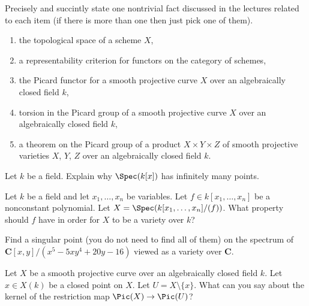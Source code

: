 \begin{exercise}[Theorems]
\label{exercise-results-spring-2025}
Precisely and succintly state one nontrivial fact discussed in the lectures
related to each item (if there is more than one then just pick one of them).
\begin{enumerate}
\item the topological space of a scheme $X$,
\item a representability criterion for functors on the category of schemes,
\item the Picard functor for a smooth projective curve $X$ over an
algebraically closed field $k$,
\item torsion in the Picard group of a smooth projective curve $X$ over an
algebraically closed field $k$,
\item a theorem on the Picard group of a product $X \times Y \times Z$
of smooth projective varieties $X$, $Y$, $Z$ over an algebraically
closed field $k$.
\end{enumerate}
\end{exercise}

\begin{exercise}
\label{exercise-affine-line-infinite-nr-points}
Let $k$ be a field. Explain why $\Spec(k[x])$ has infinitely many points.
\end{exercise}

\begin{exercise}
\label{exercise-hypersurface-variety}
Let $k$ be a field and let $x_1, \ldots, x_n$ be variables.
Let $f \in k[x_1, \ldots, x_n]$ be a nonconstant polynomial.
Let $X = \Spec(k[x_1, \ldots, x_n]/(f))$. What property
should $f$ have in order for $X$ to be a variety over $k$?
\end{exercise}

\begin{exercise}
\label{exercise-find-singular-point}
Find a singular point (you do not need to find all of them)
on the spectrum of $\mathbf{C}[x, y]/(x^5 - 5xy^4 + 20y - 16)$
viewed as a variety over $\mathbf{C}$.
\end{exercise}

\begin{exercise}
\label{exercise-kernel-restriction-pic-curve}
Let $X$ be a smooth projective curve over an algebraically closed
field $k$. Let $x \in X(k)$ be a closed point on $X$. Let
$U = X \setminus \{x\}$. What can you say about the kernel of
the restriction map $\Pic(X) \to \Pic(U)$?
\end{exercise}

